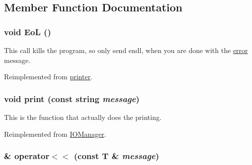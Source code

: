 \subsection{Member Function Documentation}
\hypertarget{classJKBuilder_1_1error_a7f207ac705d33a0cd9794a9f0b4a1fa0}{
\subsubsection[{EoL}]{\setlength{\rightskip}{0pt plus 5cm}void EoL ()}}
\label{classJKBuilder_1_1error_a7f207ac705d33a0cd9794a9f0b4a1fa0}


This call kills the program, so only send endl, when you are done with the \hyperlink{classJKBuilder_1_1error}{error} message. 

Reimplemented from \hyperlink{classJKBuilder_1_1printer_a7f207ac705d33a0cd9794a9f0b4a1fa0}{printer}.\hypertarget{classJKBuilder_1_1printer_aa32ee0a81ade611982bfc9861c5a05bb}{
\subsubsection[{print}]{\setlength{\rightskip}{0pt plus 5cm}void print (const string {\em message})}}
\label{classJKBuilder_1_1printer_aa32ee0a81ade611982bfc9861c5a05bb}


This is the function that actually does the printing. 

Reimplemented from \hyperlink{classJKBuilder_1_1IOManager_a3abc9519dd5220ecb1154daa25f557fe}{IOManager}.\hypertarget{classJKBuilder_1_1IOManager_a505a35212a21e4884ed24b021c0add4b}{
\subsubsection[{operator$<$$<$}]{ \& operator$<$$<$ (const T \& {\em message})}}
\label{classJKBuilder_1_1IOManager_a505a35212a21e4884ed24b021c0add4b}


